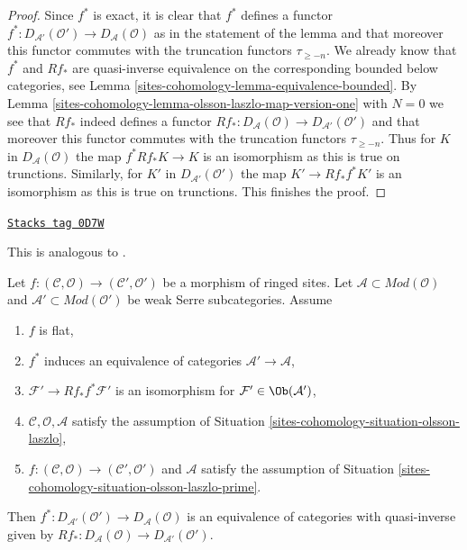 \begin{proof}
Since $f^*$ is exact, it is clear that $f^*$ defines a functor
$f^* : D_{\mathcal{A}'}(\mathcal{O}') \to D_\mathcal{A}(\mathcal{O})$
as in the statement of the lemma and that moreover this
functor commutes with the truncation functors $\tau_{\geq -n}$.
We already know that $f^*$ and $Rf_*$ are quasi-inverse
equivalence on the corresponding bounded below categories,
see Lemma \ref{sites-cohomology-lemma-equivalence-bounded}.
By Lemma \ref{sites-cohomology-lemma-olsson-laszlo-map-version-one}
with $N = 0$ we see that $Rf_*$ indeed defines a functor
$Rf_* : D_\mathcal{A}(\mathcal{O}) \to D_{\mathcal{A}'}(\mathcal{O}')$
and that moreover this functor commutes with
the truncation functors $\tau_{\geq -n}$.
Thus for $K$ in $D_\mathcal{A}(\mathcal{O})$ the map
$f^*Rf_*K \to K$ is an isomorphism as this is true
on trunctions.
Similarly, for $K'$ in $D_{\mathcal{A}'}(\mathcal{O}')$ the map
$K' \to Rf_*f^*K'$ is an isomorphism as this is true
on trunctions.
This finishes the proof.
\end{proof}

\begin{lemma}
\label{sites-cohomology-lemma-equivalence-unbounded-two}
\href{https://stacks.math.columbia.edu/tag/0D7W}{\texttt{Stacks tag 0D7W}}

\begin{reference}
This is analogous to \cite[Theorem 2.2.3]{six-I}.
\end{reference}
Let $f : (\mathcal{C}, \mathcal{O}) \to (\mathcal{C}', \mathcal{O}')$
be a morphism of ringed sites.
Let $\mathcal{A} \subset \textit{Mod}(\mathcal{O})$
and $\mathcal{A}' \subset \textit{Mod}(\mathcal{O}')$
be weak Serre subcategories. Assume
\begin{enumerate}
\item $f$ is flat,
\item $f^*$ induces an equivalence of categories
$\mathcal{A}' \to \mathcal{A}$,
\item $\mathcal{F}' \to Rf_*f^*\mathcal{F}'$ is an isomorphism
for $\mathcal{F}' \in \Ob(\mathcal{A}')$,
\item $\mathcal{C}, \mathcal{O}, \mathcal{A}$ satisfy the
assumption of Situation \ref{sites-cohomology-situation-olsson-laszlo},
\item $f : (\mathcal{C}, \mathcal{O}) \to (\mathcal{C}', \mathcal{O}')$
and $\mathcal{A}$ satisfy the assumption of
Situation \ref{sites-cohomology-situation-olsson-laszlo-prime}.
\end{enumerate}
Then $f^* : D_{\mathcal{A}'}(\mathcal{O}') \to D_\mathcal{A}(\mathcal{O})$
is an equivalence of categories with quasi-inverse given by
$Rf_* : D_\mathcal{A}(\mathcal{O}) \to D_{\mathcal{A}'}(\mathcal{O}')$.
\end{lemma}


